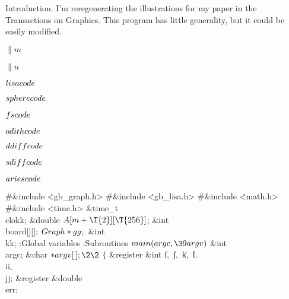 
\datethis

Introduction. I'm reregenerating the illustrations for my
paper in the Transactions on Graphics. This program has little
generality, but it could be easily modified.

\Y\B\4\D$\|m$ \5
\par
\B\4\D$\|n$ \5
\par
\B\4\D$\\{lisacode}$ \5
\par
\B\4\D$\\{spherecode}$ \5
\par
\B\4\D$\\{fscode}$ \5
\par
\B\4\D$\\{odithcode}$ \5
\par
\B\4\D$\\{ddiffcode}$ \5
\par
\B\4\D$\\{sdiffcode}$ \5
\par
\B\4\D$\\{ariescode}$ \5
\par
\Y\B\8\#\&{include} \.{<gb\_graph.h>}\6
\8\#\&{include} \.{<gb\_lisa.h>}\6
\8\#\&{include} \.{<math.h>}\6
\8\#\&{include} \.{<time.h>}\6
\ATH\6
\&{time\_t} \\{clokk};\6
\&{double} ${}\|A[\|m+\T{2}][\T{256}]{}$;\6
\&{int} \\{board}[][];\7
${}\\{Graph}*\\{gg};{}$\7
\&{int} \\{kk};\7
:Global variables\X\6
:Subroutines\X\7
${}\\{main}(\\{argc},\39\\{argv}){}$\1\1\6
\&{int} \\{argc};\6
\&{char} ${}{*}\\{argv}[\,];\2\2{}$\6
${}\{{}$\1\6
\&{register} \&{int} \|i${},{}$ \|j${},{}$ \|k${},{}$ \|l${},{}$ \\{ii}${},{}$ %
\\{jj};\6
\&{register} \&{double} \\{err};\6
